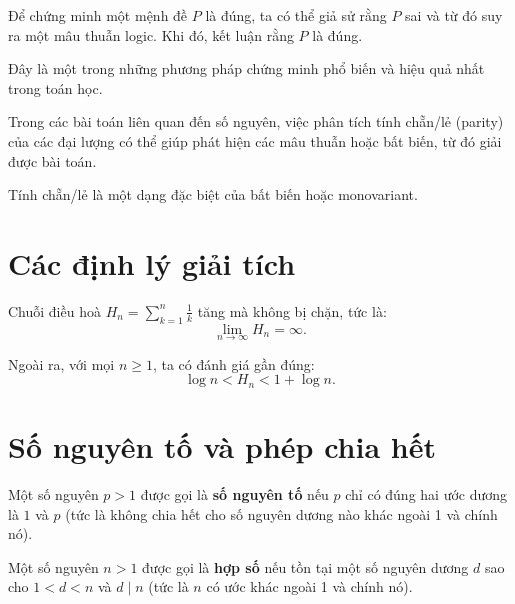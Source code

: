 \documentclass[../imo-training-open-book.tex]{subfiles}
\begin{document}
\begin{theorem}
    \label{theorem:proof-by-contradiction}
    Để chứng minh một mệnh đề \(P\) là đúng, ta có thể giả sử rằng \(P\) sai và từ đó suy ra một mâu thuẫn logic. Khi đó, kết luận rằng \(P\) là đúng.
    
    Đây là một trong những phương pháp chứng minh phổ biến và hiệu quả nhất trong toán học.
\end{theorem}

\begin{theorem}
    \label{theorem:parity-strategy}
    Trong các bài toán liên quan đến số nguyên, việc phân tích tính chẵn/lẻ (parity) của các đại lượng có thể giúp phát hiện các mâu thuẫn hoặc bất biến, từ đó giải được bài toán.
    
    Tính chẵn/lẻ là một dạng đặc biệt của bất biến hoặc monovariant.
\end{theorem}

\newpage

\section{Các định lý giải tích}

\begin{lemma}
    \label{lemma:harmonic-growth}
    Chuỗi điều hoà \( H_n = \sum_{k=1}^n \frac{1}{k} \) tăng mà không bị chặn, tức là:
    \[
        \lim_{n \to \infty} H_n = \infty.
    \]

    Ngoài ra, với mọi \(n \ge 1\), ta có đánh giá gần đúng:
    \[
        \log n < H_n < 1 + \log n.
    \]
\end{lemma}

\newpage

\section{Số nguyên tố và phép chia hết}

\begin{definition}[Số nguyên tố]\label{def:prime}
    Một số nguyên \( p > 1 \) được gọi là \textbf{số nguyên tố} nếu \( p \) chỉ có đúng hai ước dương là \( 1 \) và \( p \) (tức là không chia hết cho số nguyên dương nào khác ngoài 1 và chính nó).
\end{definition}
    
\begin{definition}[Hợp số]\label{def:composite}
    Một số nguyên \( n > 1 \) được gọi là \textbf{hợp số} nếu tồn tại một số nguyên dương \( d \) sao cho \( 1 < d < n \) và \( d \mid n \) (tức là \( n \) có ước khác ngoài 1 và chính nó).
\end{definition}
\end{document}
